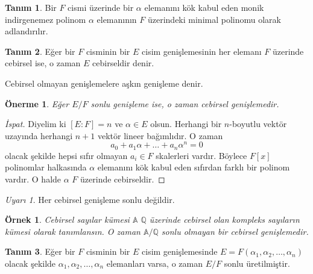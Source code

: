 \documentclass[draft]{article}
\newtheorem{prop}[thm]{Önerme}
\newtheorem{exmp}{Örnek}
\theoremstyle{definition}
\newtheorem{defn}{Tanım}[section]
\theoremstyle{remark}
\newtheorem{rem}{Uyarı}[section]
\begin{document}
            \begin{defn}
                Bir $F$ cismi üzerinde bir $\alpha$ elemanını kök kabul eden monik indirgenemez polinom $\alpha$ elemanının $F$ üzerindeki minimal polinomu olarak adlandırılır.
            \end{defn}
            
            \begin{defn}
                Eğer bir $F$ cisminin bir $E$ cisim genişlemesinin her elemanı $F$ üzerinde cebirsel ise, o zaman $E$ cebirseldir denir.\par
                Cebirsel olmayan genişlemelere aşkın genişleme denir.
            \end{defn}
            
            \begin{prop}
                Eğer $E/F$ sonlu genişleme ise, o zaman cebirsel genişlemedir.
            \end{prop}
            
            \begin{proof}[İspat]
                Diyelim ki $[E:F] = n$ ve $\alpha \in E$ olsun. Herhangi bir $n$-boyutlu vektör uzayında herhangi $n + 1$ vektör lineer bağımlıdır.
                O zaman
                \begin{equation*}
                    a_0 + a_1\alpha + \dots + a_n\alpha^n = 0
                \end{equation*}
                olacak şekilde hepsi sıfır olmayan $a_i \in F$ skalerleri vardır. Böylece $F[x]$ polinomlar halkasında $\alpha$ elemanını kök kabul eden sıfırdan farklı bir polinom vardır. O halde $\alpha$ $F$ üzerinde cebirseldir.
            \end{proof}
            
            \begin{rem}
                Her cebirsel genişleme sonlu değildir.
            \end{rem}
            
            \begin{exmp}
                Cebirsel sayılar kümesi $\mathbb{A}$ $\mathbb{Q}$ üzerinde cebirsel olan kompleks sayıların kümesi olarak tanımlansın. O zaman $\mathbb{A}/\mathbb{Q}$ sonlu olmayan bir cebirsel genişlemedir.
                
            \end{exmp}
            
            \begin{defn}
                Eğer bir $F$ cisminin bir $E$ cisim genişlemesinde $E = F(\alpha_1, \alpha_2, \dots, \alpha_n)$ olacak şekilde $\alpha_1, \alpha_2, \dots, \alpha_n$ elemanları varsa, o zaman $E/F$ sonlu üretilmiştir.
            \end{defn}
            
\end{document}
